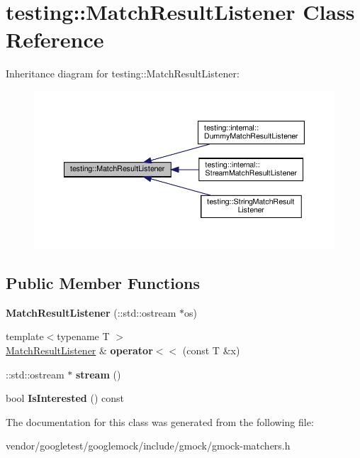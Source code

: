 \hypertarget{classtesting_1_1_match_result_listener}{}\section{testing\+:\+:Match\+Result\+Listener Class Reference}
\label{classtesting_1_1_match_result_listener}


Inheritance diagram for testing\+:\+:Match\+Result\+Listener\+:
\nopagebreak
\begin{figure}[H]
\begin{center}
\leavevmode
\includegraphics[width=350pt]{classtesting_1_1_match_result_listener__inherit__graph}
\end{center}
\end{figure}
\subsection*{Public Member Functions}
\begin{DoxyCompactItemize}
\item 
\mbox{\label{classtesting_1_1_match_result_listener_a245c360286cd0496d22a4d2fde80eb0b}} 
{\bfseries Match\+Result\+Listener} (\+::std\+::ostream $\ast$os)
\item 
\mbox{\label{classtesting_1_1_match_result_listener_a89f628a452635d1502a9062d9c864ebd}} 
{\footnotesize template$<$typename T $>$ }\\\hyperlink{classtesting_1_1_match_result_listener}{Match\+Result\+Listener} \& {\bfseries operator$<$$<$} (const T \&x)
\item 
\mbox{\label{classtesting_1_1_match_result_listener_a5abecb247e005f7f50a94898e3f44ee3}} 
\+::std\+::ostream $\ast$ {\bfseries stream} ()
\item 
\mbox{\label{classtesting_1_1_match_result_listener_ac34f9771f2ba6128cd6a1348b3aebda3}} 
bool {\bfseries Is\+Interested} () const
\end{DoxyCompactItemize}


The documentation for this class was generated from the following file\+:\begin{DoxyCompactItemize}
\item 
vendor/googletest/googlemock/include/gmock/gmock-\/matchers.\+h\end{DoxyCompactItemize}
